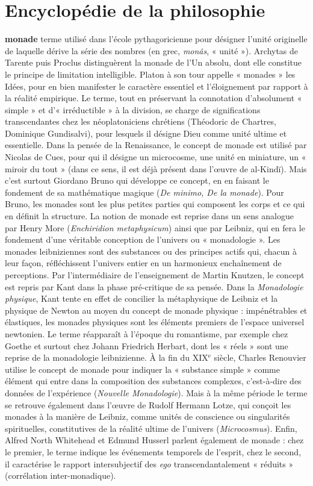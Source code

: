 
\section{Encyclopédie de la philosophie}
{\bf monade} terme utilisé dans l’école pythagoricienne pour désigner l’unité originelle
de laquelle dérive la série des nombres
(en grec, {\it monâs}, « unité »). Archytas de
Tarente puis Proclus distinguèrent la
monade de l’Un absolu, dont elle constitue le principe de limitation intelligible.
Platon à son tour appelle « monades » les
Idées, pour en bien manifester le caractère essentiel et l'éloignement par rapport
à la réalité empirique. Le terme, tout en
préservant la connotation d’absolument
« simple » et d’« irréductible » à la division, se charge de significations transcendantes chez les néoplatoniciens chrétiens
(Théodoric de Chartres, Dominique Gundisalvi), pour lesquels il désigne Dieu
comme unité ultime et essentielle. Dans
la pensée de la Renaissance, le concept de
monade est utilisé par Nicolas de Cues,
pour qui il désigne un microcosme, une
unité en miniature, un « miroir du tout »
(dans ce sens, il est déjà présent dans
l’œuvre de al-Kindï). Mais c’est surtout
Giordano Bruno qui développe ce
concept, en en faisant le fondement de sa
mathématique magique ({\it De minimo, De
la monade}). Pour Bruno, les monades
sont les plus petites parties qui composent
les corps et ce qui en définit la structure.
La notion de monade est reprise dans un
sens analogue par Henry More ({\it Enchiridion metaphysicum}) ainsi que par Leibniz, qui en fera le fondement d’une
véritable conception de l’univers ou « monadologie ». Les monades leibniziennes
sont des substances ou des principes actifs
qui, chacun à leur façon, réfléchissent
l'univers entier en un harmonieux enchaînement de perceptions. Par l’intermédiaire de l’enseignement de Martin
Knutzen, le concept est repris par Kant
dans la phase pré-critique de sa pensée.
Dans la {\it Monadologie physique}, Kant
tente en effet de concilier la métaphysique de Leibniz et la physique de Newton au moyen du concept de monade
physique : impénétrables et élastiques, les
monades physiques sont les éléments premiers de l’espace universel newtonien.
Le terme réapparaît à l’époque du
romantisme, par exemple chez Goethe et
surtout chez Johann Friedrich Herbart,
dont les « réels » sont une reprise de la
monadologie leibnizienne. À la fin du
{\footnotesize XIX}$^\text{e}$ siècle, Charles Renouvier utilise le
concept de monade pour indiquer la
« substance simple » comme élément qui
entre dans la composition des substances
complexes, c’est-à-dire des données de
l'expérience ({\it Nouvelle  Monadologie}).
Mais à la même période le terme se
retrouve également dans l’œuvre de
Rudolf Hermann Lotze, qui conçoit les
monades à la manière de Leibniz, comme
unités de conscience ou singularités spirituelles, constitutives de la réalité ultime
de l’univers ({\it Microcosmus}). Enfin, Alfred
North Whitehead et Edmund Husserl
parlent également de monade : chez le
premier, le terme indique les événements
%
temporels de l’esprit, chez le second, il
caractérise le rapport intersubjectif des
{\it ego} transcendantalement « réduits » (corrélation inter-monadique).

 


